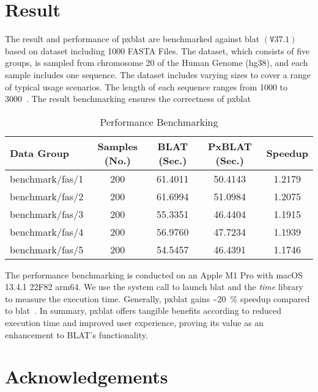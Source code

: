 \section*{Result}\label{sec:result}

The result and performance of \gls{pxblat} are benchmarked against \gls{blat} \(\left(\mathtt{V}37.1\right)\) based on dataset including \num{1000} FASTA Files.
The dataset, which consists of five groups,  is sampled from chromosome \num[round-mode=places, round-precision=0]{20} of the Human Genome (hg38), and each sample includes one sequence.
The dataset includes varying sizes to cover a range of typical usage scenarios.
The length of each sequence ranges from \num{1000} to \num{3000}~.
The result benchmarking ensures the correctness of \gls{pxblat}~

\begin{table*}
	\centering
	\caption{Performance  Benchmarking}
	\label{tab:performance-evaluation}
	\begin{tabular}{lSSSS}
		\toprule
		Data Group      & {Samples (No.)} & {BLAT (Sec.)} & {PxBLAT (Sec.)} & {Speedup} \\
		\midrule
		benchmark/fas/1 & 200             & 61.4011       & 50.4143         & 1.2179    \\
		benchmark/fas/2 & 200             & 61.6994       & 51.0984         & 1.2075    \\
		benchmark/fas/3 & 200             & 55.3351       & 46.4404         & 1.1915    \\
		benchmark/fas/4 & 200             & 56.9760       & 47.7234         & 1.1939    \\
		benchmark/fas/5 & 200             & 54.5457       & 46.4391         & 1.1746    \\
		\bottomrule
	\end{tabular}
\end{table*}

The performance benchmarking is conducted on an Apple M1 Pro with macOS 13.4.1 22F82 arm64.
We use the system call to launch \gls{blat} and the \emph{time} library to measure the execution time.
Generally, \gls{pxblat} gains \textasciitilde\SI[per-mode=symbol,round-precision=0]{20}{\percent} speedup compared to \gls{blat}~.
In summary, \gls{pxblat}  offers tangible benefits according to reduced execution time and improved user experience, proving its value as an enhancement to BLAT's functionality.


\section*{Acknowledgements}\label{sec:acknowledgements}

